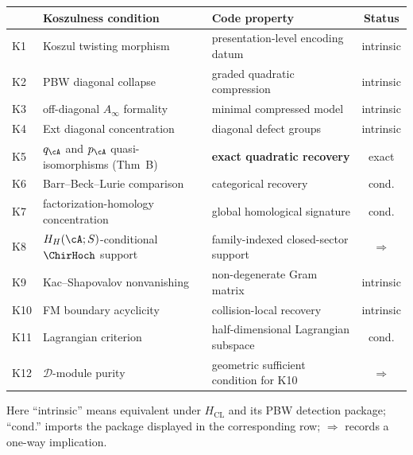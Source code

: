 \begin{proposition}
\begin{center}
\renewcommand{\arraystretch}{1.4}
\small
\begin{tabular}{l@{\;}l@{\;\;}l@{\;\;}c}
& \textbf{Koszulness condition}
& \textbf{Code property}
& \textbf{Status} \\
\midrule
K1 & Koszul twisting morphism
 & presentation-level encoding datum
 & intrinsic \\
K2 & PBW diagonal collapse
 & graded quadratic compression
 & intrinsic \\
K3 & off-diagonal $A_\infty$ formality
 & minimal compressed model
 & intrinsic \\
K4 & Ext diagonal concentration
 & diagonal defect groups
 & intrinsic \\
K5 & $q_\cA$ and $p_\cA$ quasi-isomorphisms \textup{(}Thm~B\textup{)}
 & \textbf{exact quadratic recovery}
 & exact \\
K6 & Barr--Beck--Lurie comparison
 & categorical recovery
 & cond. \\
K7 & factorization-homology concentration
 & global homological signature
 & cond. \\
K8 & $H_H(\cA;S)$-conditional $\ChirHoch$ support
 & family-indexed closed-sector support
 & $\Rightarrow$ \\
K9 & Kac--Shapovalov nonvanishing
 & non-degenerate Gram matrix
 & intrinsic \\
K10 & FM boundary acyclicity
 & collision-local recovery
 & intrinsic \\
K11 & Lagrangian criterion
 & half-dimensional Lagrangian subspace
 & cond. \\
K12 & $\mathcal D$-module purity
 & geometric sufficient condition for K10
 & $\Rightarrow$
\end{tabular}
\end{center}
Here ``intrinsic'' means equivalent under $H_{\mathrm{CL}}$ and its
PBW detection package; ``cond.'' imports the package displayed in the
corresponding row; $\Rightarrow$ records a one-way implication.
\end{proposition}

